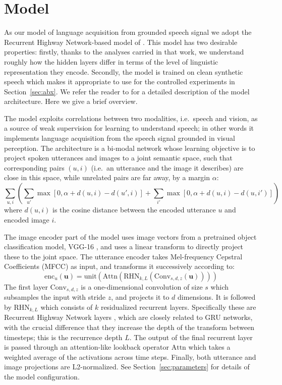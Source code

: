 \section{Model}
\label{sec:model}
As our model of language acquisition from grounded speech signal we
adopt the Recurrent Highway Network-based model
of \citet{chrupala2017representations}. This model has two
desirable properties: firstly, thanks to the analyses carried in 
that work, we understand roughly how the
hidden layers differ in terms of the level of linguistic
representation they encode. Secondly, the model is trained on clean
synthetic speech which makes it appropriate to use for the controlled
experiments in Section~\ref{sec:abx}.
We refer the reader to \citet{chrupala2017representations} for a
detailed description of the model architecture. Here we give a brief
overview.

The model exploits correlations between two modalities, i.e.\ speech
and vision, as a source of weak supervision for learning to understand
speech; in other words it implements language acquisition from the
speech signal grounded in visual perception.  The architecture is a
bi-modal network whose learning objective is to project spoken
utterances and images to a joint semantic space, such that
corresponding pairs $(u,i)$ (i.e.\ an utterance and the image it
describes) are close in this space, while unrelated pairs are far
away, by a margin $\alpha$:
\begin{dmath}
  \sum_{u,i} \left(\sum_{u'} \max[0, \alpha + d(u,i) - d(u',i)] +
    \sum_{i'} \max[0, \alpha + d(u,i) - d(u,i')] \right)
\end{dmath}
where $d(u,i)$ is the cosine distance between the encoded utterance $u$
and encoded image $i$.

The image encoder part of the model uses image vectors from a
pretrained object classification model, VGG-16 \citep{simonyan2014very}, and uses a linear
transform to directly project these to the joint space.
The utterance encoder takes Mel-frequency Cepstral Coefficients (MFCC)
as input, and transforms it successively according to:
\begin{equation}
  \label{eq:encode_u}
  \mathrm{enc}_u(\mathbf{u}) = \mathrm{unit}(\mathrm{Attn}(\mathrm{RHN}_{k,L} (\mathrm{Conv}_{s,d,z}(\mathbf{u}))))
\end{equation}
The first layer $\mathrm{Conv}_{s,d,z}$ is a one-dimensional
convolution of size $s$ which subsamples the input with stride $z$,
and projects it to $d$ dimensions. It is followed by
$\mathrm{RHN}_{k,L}$ which consists of $k$ residualized recurrent
layers. Specifically these are Recurrent Highway Network layers
\citep{zilly2016recurrent}, which are closely related to GRU networks,
with the crucial difference that they increase the depth of the
transform between timesteps; this is the recurrence depth $L$. The
output of the final recurrent layer is passed through an
attention-like lookback operator $\mathrm{Attn}$ which takes a
weighted average of the activations across time steps. Finally,
both utterance and image projections are L2-normalized. See
Section~\ref{sec:parameters} for details of the model configuration.

